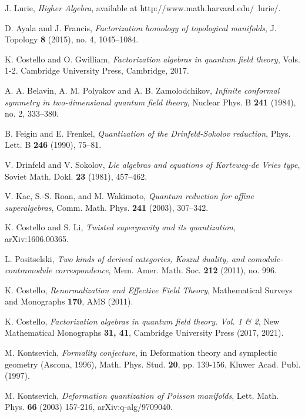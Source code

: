 \begin{thebibliography}{99}
 J. Lurie, \emph{Higher Algebra}, available at http://www.math.harvard.edu/~lurie/.

 D. Ayala and J. Francis, \emph{Factorization homology of topological manifolds}, J. Topology \textbf{8} (2015), no. 4, 1045--1084.

 K. Costello and O. Gwilliam, \emph{Factorization algebras in quantum field theory}, Vols. 1-2. Cambridge University Press, Cambridge, 2017.

 A. A. Belavin, A. M. Polyakov and A. B. Zamolodchikov, \emph{Infinite conformal symmetry in two-dimensional quantum field theory}, Nuclear Phys. B \textbf{241} (1984), no. 2, 333--380.

 B. Feigin and E. Frenkel, \emph{Quantization of the Drinfeld-Sokolov reduction}, Phys. Lett. B \textbf{246} (1990), 75--81.

 V. Drinfeld and V. Sokolov, \emph{Lie algebras and equations of Korteweg-de Vries type}, Soviet Math. Dokl. \textbf{23} (1981), 457--462.

 V. Kac, S.-S. Roan, and M. Wakimoto, \emph{Quantum reduction for affine superalgebras}, Comm. Math. Phys. \textbf{241} (2003), 307--342.

 K. Costello and S. Li, \emph{Twisted supergravity and its quantization}, arXiv:1606.00365.

 L. Positselski, \emph{Two kinds of derived categories, Koszul duality, and comodule-contramodule correspondence}, Mem. Amer. Math. Soc. \textbf{212} (2011), no. 996.


K. Costello, \emph{Renormalization and Effective Field Theory}, 
Mathematical Surveys and Monographs \textbf{170}, AMS (2011).

K. Costello, \emph{Factorization algebras in quantum field theory. Vol. 1 \& 2}, 
New Mathematical Monographs \textbf{31, 41}, Cambridge University Press (2017, 2021).

M. Kontsevich, \emph{Formality conjecture}, 
in Deformation theory and symplectic geometry (Ascona, 1996), 
Math. Phys. Stud. \textbf{20}, pp. 139-156, Kluwer Acad. Publ. (1997).

M. Kontsevich, \emph{Deformation quantization of Poisson manifolds}, 
Lett. Math. Phys. \textbf{66} (2003) 157-216, arXiv:q-alg/9709040.


\end{thebibliography}
